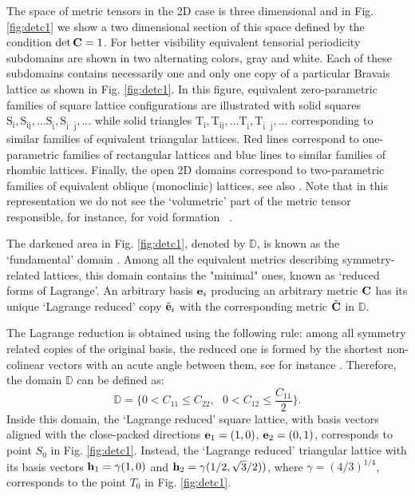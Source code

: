 \documentclass[CRPHYS,Unicode,manuscript]{cedram}
\begin{document}
The  space of metric tensors in the 2D case  is three dimensional and in Fig. \ref{fig:detc1} we  show  a two dimensional  section of this  space defined by the condition $\det \bold C = 1$.  For better visibility equivalent  tensorial  periodicity  subdomains are shown in  two alternating colors,  gray and white.  Each of these subdomains contains necessarily one and only one copy of a particular Bravais lattice as shown in Fig. \ref{fig:detc1}.  In this figure, equivalent zero-parametric families of square lattice configurations are illustrated with solid squares $\mathrm{S_i,S_{ij},...S_{\bar i},S_{\bar{i}\text{ }\bar{j} },.}..$  while solid triangles $\mathrm{T_i,T_{ij},...T_{\bar i},T_{\bar{i}\text{ } \bar{j}},..}.$ corresponding to similar families of equivalent triangular lattices.  Red lines correspond to one-parametric families of rectangular lattices and blue lines to similar families of  rhombic lattices. Finally,  the open 2D domains correspond to two-parametric families of equivalent oblique (monoclinic) lattices, see also \cite{Cayron2019-vs,Gao2020-qy,Gao2020-bx,Gao2020-zy}. Note that in this representation we do not see the  `volumetric' part of the  metric tensor responsible, for instance,    for void   formation ~\cite{Marconi2005-cp}.


The darkened area  in Fig. \ref{fig:detc1},  denoted  by  $\mathbb D$,   is known as the ‘fundamental’ domain  \cite{Engel1986-tm}.   Among all the equivalent metrics describing  symmetry-related lattices, this domain contains the  "minimal" ones, known as   ‘reduced forms of Lagrange’.  
An arbitrary basis $\bold e_i$  producing an arbitrary metric $ \bold C $ has its   unique `Lagrange reduced'  copy $\tilde{\bf e}_i$ with the corresponding metric  $ \tilde{\bold C} $ in  $\mathbb D$. 
 
The Lagrange reduction is obtained using the following rule:   among all symmetry related copies  of the original basis, the reduced one  is formed by  the shortest non-colinear  vectors  with an acute angle between them, see for instance  \cite{Conti2004-sv}. Therefore, the   domain  $\mathbb D$  can be  defined as:
\begin{equation}
 \label{eq:reduced}
\mathbb D = \bigg\{0<C_{11}\leq C_{22},\text{   }
0<C_{12}\leq \frac{C_{11}}{2}\bigg\}.
\end{equation}
Inside this domain,  the  `Lagrange reduced'   square  lattice,  with  basis vectors aligned with the close-packed directions  ${\bf e}_1=(1,0)$, ${\bf e}_2=(0,1)$,  corresponds to point  $S_0$ in Fig. \ref{fig:detc1}. Instead, the  `Lagrange reduced'  triangular lattice with its  basis  vectors   ${\bf h}_1=\gamma(1,0)$  and ${\bf h}_2=\gamma(1/2,\sqrt{3}/2))$, where $\gamma =  (4/3)^ {1/4}$,  corresponds to the point  $T_0$ in Fig. \ref{fig:detc1}.
 
\end{document}
